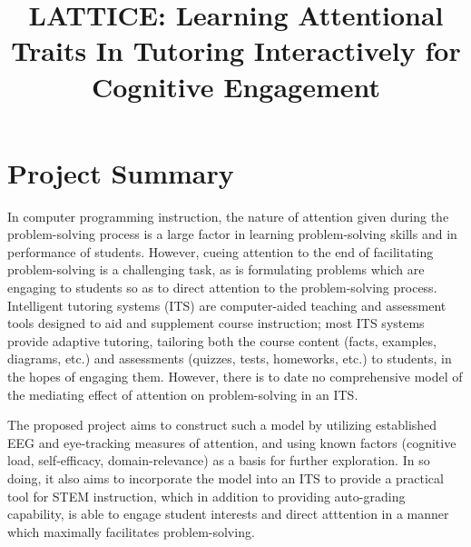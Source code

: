 \documentclass[hidelinks,11pt]{article}
\begin{document}
\title{LATTICE: Learning Attentional Traits In Tutoring Interactively for Cognitive Engagement}
\maketitle
\thispagestyle{empty}
\pagestyle{empty}

\pagebreak


\section{ Project Summary }

In computer programming instruction, the nature of attention given during the
problem-solving process is a large factor in learning problem-solving skills
and in performance of students. However, cueing attention to the end of
facilitating problem-solving is a challenging task, as is formulating problems
which are engaging to students so as to direct attention to the problem-solving
process.  Intelligent tutoring systems (ITS) are computer-aided teaching and
assessment tools designed to aid and supplement course instruction; most ITS
systems provide adaptive tutoring, tailoring both the course content (facts,
examples, diagrams, etc.) and assessments (quizzes, tests, homeworks, etc.) to
students, in the hopes of engaging them.  However, there is to date no
comprehensive model of the mediating effect of attention on problem-solving in
an ITS. 

The proposed project aims to construct such a model by utilizing established
EEG and eye-tracking measures of attention, and using known factors (cognitive
load, self-efficacy, domain-relevance) as a basis for further exploration. In
so doing, it also aims to incorporate the model into an ITS to provide a
practical tool for STEM instruction, which in addition to providing
auto-grading capability, is able to engage student interests and direct
atttention in a manner which maximally facilitates problem-solving.
\end{document}
